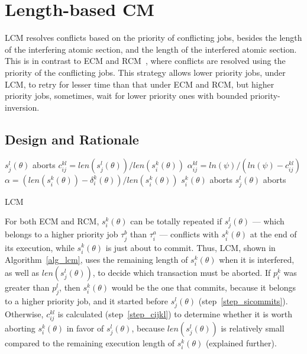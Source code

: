 \section{Length-based CM}

LCM resolves conflicts based on the priority of conflicting jobs, besides the length of the interfering atomic section, and the length of the interfered atomic section. This is in contrast to ECM and RCM~\cite{stmconcurrencycontrol:emsoft11}, where conflicts are resolved using the priority of the conflicting jobs. This strategy allows lower priority jobs, under LCM, to retry for lesser time than that under ECM and RCM, but higher priority jobs, sometimes, wait for lower priority ones with bounded priority-inversion.

\subsection{\label{sec 9.1} Design and Rationale}

\begin{algorithm}
\footnotesize{
\LinesNumbered
{}
	{$s_j^l(\theta)$ aborts\label{step_sicommits}\;}
	{$c_{ij}^{kl}=len(s_j^l(\theta))/len(s_i^k(\theta))$\label{step_cijkl}\;
	$\alpha_{ij}^{kl}=ln(\psi)/(ln(\psi)-c_{ij}^{kl})$\label{step_alphaijkl}\;
	$\alpha=\left(len(s_i^k(\theta))-\delta_i^k(\theta)\right)/len(s_i^k(\theta))$\;
	{$s_i^k(\theta)$ aborts\label{step_siaborts}\;}
	{$s_j^l(\theta)$ aborts\label{step_sjaborts}\;}
	}
	}
\caption{LCM}
\label{alg_lcm}
\end{algorithm}

For both ECM and RCM, $s_{i}^{k}(\theta)$ can be totally repeated if $s_{j}^{l}(\theta)$ --- which belongs to a higher priority job $\tau_{j}^b$ than $\tau_{i}^a$ --- conflicts with $s_{i}^{k}(\theta)$
at the end of its execution, while $s_{i}^{k}(\theta)$ is just about
to commit. Thus, LCM, shown in Algorithm~\ref{alg_lcm}, uses the remaining length of $s_{i}^{k}(\theta)$ when it is interfered,
as well as $len(s_{j}^{l}(\theta))$, to decide which transaction must be aborted. If $p_i^k$ was greater than $p_j^l$, then $s_i^k(\theta)$ would be the one that commits, because it belongs to a higher priority job, and it started before $s_j^l(\theta)$ (step~\ref{step_sicommits}). Otherwise, $c_{ij}^{kl}$ is calculated (step~\ref{step_cijkl}) to determine whether it is worth aborting $s_i^k(\theta)$ in favor of $s_j^l(\theta)$, because $len(s_j^l(\theta))$ is relatively small compared to the remaining execution length of $s_i^k(\theta)$  (explained further).

